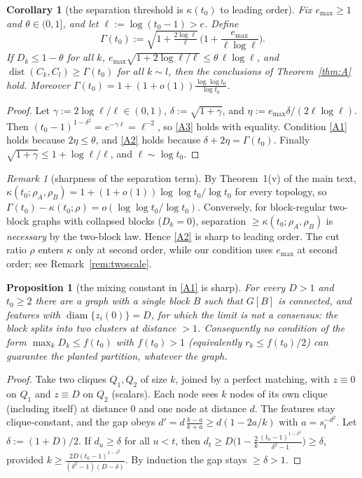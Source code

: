 \documentclass[11pt]{article}
\newtheorem{proposition}[theorem]{Proposition}
\newtheorem{corollary}[theorem]{Corollary}
\theoremstyle{definition}
\theoremstyle{remark}
\newtheorem{remark}[theorem]{Remark}
\newcommand{\dist}{\operatorname{dist}}
\newcommand{\diam}{\operatorname{diam}}
\begin{document}
\begin{corollary}[the separation threshold is $\kappa(t_0)$ to leading order]\label{cor:asym}
Fix $e_{\max}\ge1$ and $\theta\in(0,1]$, and let $\ell:=\log(t_0-1)>e$. Define
\[
\Gamma(t_0):=\sqrt{1+\tfrac{2\log\ell}{\ell}}\,\Big(1+\frac{e_{\max}}{\ell\log\ell}\Big).
\]
If $D_k\le1-\theta$ for all $k$, $e_{\max}\sqrt{1+2\log\ell/\ell}\le\theta\,\ell\log\ell$, and
$\dist(C_k,C_l)\ge\Gamma(t_0)$ for all $k\sim l$, then the conclusions of Theorem~\ref{thm:A} hold. Moreover
$\Gamma(t_0)=1+(1+o(1))\frac{\log\log t_0}{\log t_0}$.
\end{corollary}
\begin{proof}
Let $\gamma:=2\log\ell/\ell\in(0,1)$, $\delta:=\sqrt{1+\gamma}$, and $\eta:=e_{\max}\delta/(2\ell\log\ell)$. Then
$(t_0-1)^{1-\delta^2}=e^{-\gamma\ell}=\ell^{-2}$, so \eqref{A3} holds with equality. Condition \eqref{A1} holds
because $2\eta\le\theta$, and \eqref{A2} holds because $\delta+2\eta=\Gamma(t_0)$. Finally
$\sqrt{1+\gamma}\le1+\log\ell/\ell$, and $\ell\sim\log t_0$.
\end{proof}

\begin{remark}[sharpness of the separation term]
By Theorem~1(v) of the main text, $\kappa(t_0;\rho_A,\rho_B)=1+(1+o(1))\log\log t_0/\log t_0$ for
every topology, so $\Gamma(t_0)-\kappa(t_0;\rho)=o(\log\log t_0/\log t_0)$. Conversely, for
block-regular two-block graphs with collapsed blocks ($D_k=0$), separation $\ge\kappa(t_0;\rho_A,\rho_B)$ is
\emph{necessary} by the two-block law. Hence \eqref{A2} is sharp to leading order. The cut ratio $\rho$ enters
$\kappa$ only at second order, while our condition uses $e_{\max}$ at second order; see Remark~\ref{rem:twoscale}.
\end{remark}

\begin{proposition}[the mixing constant in \eqref{A1} is sharp]\label{prop:sharpA}
For every $D>1$ and $t_0\ge2$ there are a graph with a single block $B$ such that $G[B]$ is connected, and features with
$\diam\{z_i(0)\}=D$, for which the limit is \emph{not} a consensus: the block splits into two clusters at
distance $>1$. Consequently no condition of the form $\max_kD_k\le f(t_0)$ with $f(t_0)>1$ (equivalently
$r_k\le f(t_0)/2$) can guarantee the planted partition, whatever the graph.
\end{proposition}
\begin{proof}
Take two cliques $Q_1,Q_2$ of size $k$, joined by a perfect matching, with $z\equiv0$ on $Q_1$ and $z\equiv D$ on
$Q_2$ (scalars). Each node sees $k$ nodes of its own clique (including itself) at distance $0$ and one node at
distance $d$. The features stay clique-constant, and the gap obeys $d'=d\,\frac{k-a}{k+a}\ge d(1-2a/k)$ with
$a=s_t^{-d^2}$. Let $\delta:=(1+D)/2$. If $d_u\ge\delta$ for all $u<t$, then
$d_t\ge D\big(1-\frac2k\frac{(t_0-1)^{1-\delta^2}}{\delta^2-1}\big)\ge\delta$, provided
$k\ge\frac{2D(t_0-1)^{1-\delta^2}}{(\delta^2-1)(D-\delta)}$. By induction the gap stays $\ge\delta>1$.
\end{proof}
\end{document}

